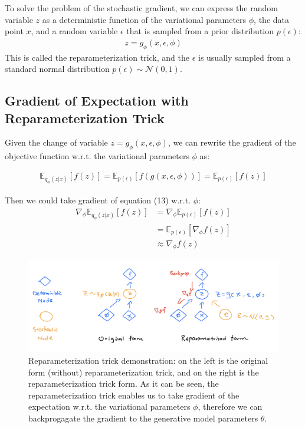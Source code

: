 \documentclass[11pt]{article}
\theoremstyle{definition}
\begin{document}
To solve the problem of the stochastic gradient, we can express the random variable $z$ as a deterministic function of the variational parameters $\phi$, the data point $x$, and a random variable $\epsilon$ that is sampled from a prior distribution $p(\epsilon)$:
\begin{align}
    z=g_\phi(x, \epsilon, \phi)
\end{align}
This is called the reparameterization trick, and the $\epsilon$ is usually sampled from a standard normal distribution $p(\epsilon) \sim \mathcal{N}(0, 1)$.

\subsection{Gradient of Expectation with Reparameterization Trick}

Given the change of variable $z=g_\phi(x, \epsilon, \phi)$, we can rewrite the gradient of the objective function w.r.t. the variational parameters $\phi$ as:

\begin{align}
    \mathbb{E}_{q_\phi(z|x)}[f(z)] = \mathbb{E}_{p(\epsilon)}[f(g(x, \epsilon, \phi))] = \mathbb{E}_{p(\epsilon)}[f(z)]
\end{align}

Then we could take gradient of equation (13) w.r.t. $\phi$:
\begin{align}
    \nabla_\phi \mathbb{E}_{q_\phi(z|x)}[f(z)] &= \nabla_\phi \mathbb{E}_{p(\epsilon)}[f(z)]\\
    &= \mathbb{E}_{p(\epsilon)}[\nabla_\phi f(z)]\\
    &\approx \nabla_\phi f(z)
\end{align}

\begin{figure}[h]
\includegraphics*[width=\textwidth]{reparam-graph.png}
\caption{Reparameterization trick demonstration: on the left is the original form (without) reparameterization trick, and on the right is the reparameterization trick form. As it can be seen, the reparameterization trick enables us to take gradient of the expectation w.r.t. the variational parameters $\phi$, therefore we can backprogagate the gradient to the generative model parameters $\theta$.}
\end{figure}
\end{document}
